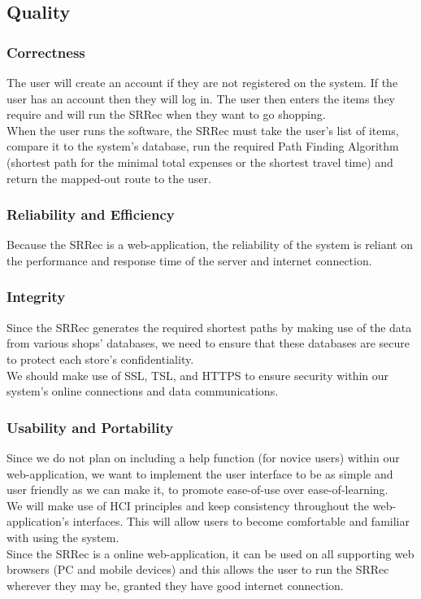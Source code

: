 \documentclass[12pt]{article}
\begin{document}
\subsection{Quality}
\subsubsection{Correctness}
The user will create an account if they are not registered on the system. If the user has an account then they will log in. The user then enters the items they require and will run the SRRec when they want to go shopping.\\
When the user runs the software, the SRRec must take the user's list of items, compare it to the system's database, run the required Path Finding Algorithm (shortest path for the minimal total expenses or the shortest travel time) and return the mapped-out route to the user.
\subsubsection{Reliability and Efficiency}
Because the SRRec is a web-application, the reliability of the system is reliant on the performance and response time of the server and internet connection. 
\subsubsection{Integrity}
Since the SRRec generates the required shortest paths by making use of the data from various shops' databases, we need to ensure that these databases are secure to protect each store's confidentiality. \\
We should make use of SSL, TSL, and HTTPS to ensure security within our system's online connections and data communications.
\subsubsection{Usability and Portability}
Since we do not plan on including a help function (for novice users) within our web-application, we want to implement the user interface to be as simple and user friendly as we can make it, to promote ease-of-use over ease-of-learning.\\
We will make use of HCI principles and keep consistency throughout the web-application's interfaces. This will allow users to become comfortable and familiar with using the system.\\
Since the SRRec is a online web-application, it can be used on all supporting web browsers (PC and mobile devices) and this allows the user to run the SRRec wherever they may be, granted they have good internet connection.\\
\end{document}
